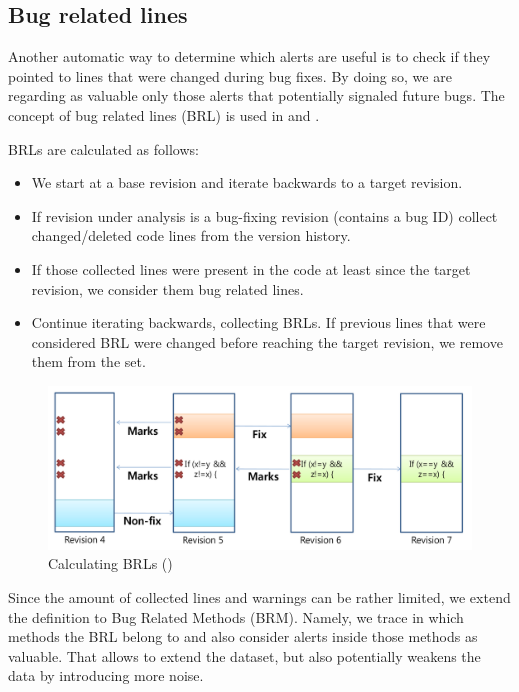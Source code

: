 \documentclass{article}
\begin{document}
\subsection{Bug related lines}

Another automatic way to determine which alerts are useful is to check if they pointed to lines that were changed during bug fixes. By doing so, we are regarding as valuable only those alerts that potentially signaled future bugs. The concept of bug related lines (BRL) is used in \cite{which_warnings} and \cite{automatic_training_set}.

BRLs are calculated as follows:
\begin{itemize}
    \item We start at a base revision and iterate backwards to a target revision. 
    \item If revision under analysis is a bug-fixing revision (contains a bug ID) collect changed/deleted code lines from the version history.
    \item If those collected lines were present in the code at least since the target revision, we consider them bug related lines.
    \item Continue iterating backwards, collecting BRLs. If previous lines that were considered BRL were changed before reaching the target revision, we remove them from the set. 
\end{itemize}

\begin{figure}[H]
    \centering
    \includegraphics[scale=0.3]{./src/brl_example.png}
    \caption{Calculating BRLs (\cite{which_warnings})}
\end{figure}


Since the amount of collected lines and warnings can be rather limited, we extend the definition to Bug Related Methods (BRM). Namely, we trace in which methods the BRL belong to and also consider alerts inside those methods as valuable. That allows to extend the dataset, but also potentially weakens the data by introducing more noise.
\end{document}
